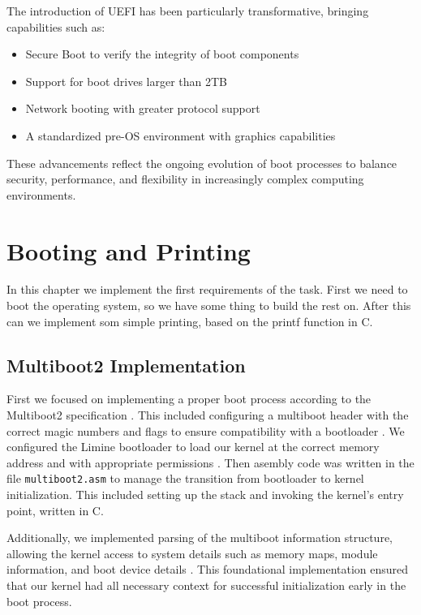 \documentclass[a4paper,11pt]{article}
\begin{document}
The introduction of UEFI has been particularly transformative, bringing capabilities such as:
\begin{itemize}
    \item Secure Boot to verify the integrity of boot components
    \item Support for boot drives larger than 2TB
    \item Network booting with greater protocol support
    \item A standardized pre-OS environment with graphics capabilities
\end{itemize}

These advancements reflect the ongoing evolution of boot processes to balance security, performance, and flexibility in increasingly complex computing environments.









\section{Booting and Printing}
In this chapter we implement the first requirements of the task. First we need to boot the operating system, so we have some thing to build the rest on. After this can we implement som simple printing, based on the printf function in C.

\subsection{Multiboot2 Implementation}
First we focused on implementing a proper boot process according to the Multiboot2 specification \cite{Multiboot} \cite{multiboot2}. This included configuring a multiboot header with the correct magic numbers and flags to ensure compatibility with a bootloader \cite{Magic_number}. We configured the Limine bootloader to load our kernel at the correct memory address and with appropriate permissions \cite{limine}. Then asembly code was written in the file \texttt{multiboot2.asm} to manage the transition from bootloader to kernel initialization. This included setting up the stack and invoking the kernel's entry point, written in C.

Additionally, we implemented parsing of the multiboot information structure, allowing the kernel access to system details such as memory maps, module information, and boot device details \cite{multiboot2}. This foundational implementation ensured that our kernel had all necessary context for successful initialization early in the boot process.
\end{document}
